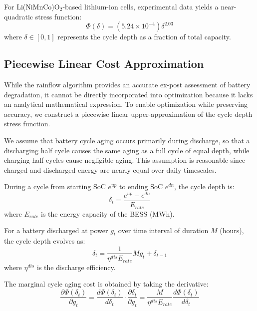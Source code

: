 \documentclass[10pt,twocolumn]{article}
\begin{document}
For Li(NiMnCo)O$_2$-based lithium-ion cells, experimental data yields a near-quadratic stress function:
\begin{equation}
\Phi(\delta) = (5.24 \times 10^{-4})\delta^{2.03}
\label{eq:stress_function}
\end{equation}
where $\delta \in [0,1]$ represents the cycle depth as a fraction of total capacity.

\subsection{Piecewise Linear Cost Approximation}

While the rainflow algorithm provides an accurate ex-post assessment of battery degradation, it cannot be directly incorporated into optimization because it lacks an analytical mathematical expression. To enable optimization while preserving accuracy, we construct a piecewise linear upper-approximation of the cycle depth stress function.

We assume that battery cycle aging occurs primarily during discharge, so that a discharging half cycle causes the same aging as a full cycle of equal depth, while charging half cycles cause negligible aging. This assumption is reasonable since charged and discharged energy are nearly equal over daily timescales.

During a cycle from starting SoC $e^{up}$ to ending SoC $e^{dn}$, the cycle depth is:
\begin{equation}
\delta_t = \frac{e^{up} - e^{dn}}{E_{rate}}
\end{equation}
where $E_{rate}$ is the energy capacity of the BESS (MWh).

For a battery discharged at power $g_t$ over time interval of duration $M$ (hours), the cycle depth evolves as:
\begin{equation}
\delta_t = \frac{1}{\eta^{dis} E_{rate}} M g_t + \delta_{t-1}
\label{eq:cycle_depth_evolution}
\end{equation}
where $\eta^{dis}$ is the discharge efficiency.

The marginal cycle aging cost is obtained by taking the derivative:
\begin{equation}
\frac{\partial \Phi(\delta_t)}{\partial g_t} = \frac{d\Phi(\delta_t)}{d\delta_t} \cdot \frac{\partial \delta_t}{\partial g_t} = \frac{M}{\eta^{dis} E_{rate}} \frac{d\Phi(\delta_t)}{d\delta_t}
\label{eq:marginal_aging}
\end{equation}
\end{document}
